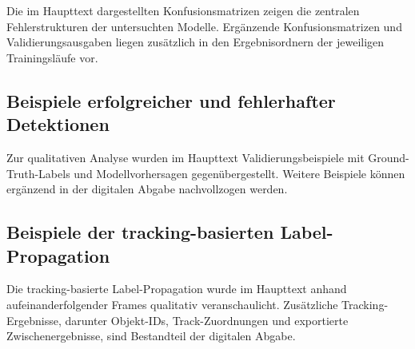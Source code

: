 Die im Haupttext dargestellten Konfusionsmatrizen zeigen die zentralen
Fehlerstrukturen der untersuchten Modelle. Ergänzende Konfusionsmatrizen und
Validierungsausgaben liegen zusätzlich in den Ergebnisordnern der jeweiligen
Trainingsläufe vor.

%

\subsection{Beispiele erfolgreicher und fehlerhafter Detektionen}

Zur qualitativen Analyse wurden im Haupttext Validierungsbeispiele mit
Ground-Truth-Labels und Modellvorhersagen gegenübergestellt. Weitere Beispiele
können ergänzend in der digitalen Abgabe nachvollzogen werden.

%

\subsection{Beispiele der tracking-basierten Label-Propagation}

Die tracking-basierte Label-Propagation wurde im Haupttext anhand
aufeinanderfolgender Frames qualitativ veranschaulicht. Zusätzliche
Tracking-Ergebnisse, darunter Objekt-IDs, Track-Zuordnungen und exportierte
Zwischenergebnisse, sind Bestandteil der digitalen Abgabe.

%


